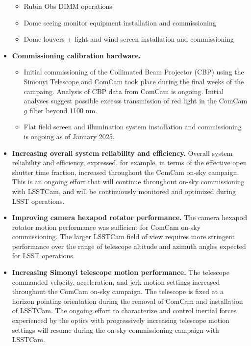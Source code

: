 \begin{itemize}
\begin{itemize}
        \item Rubin Obs DIMM operations
        \item Dome seeing monitor equipment installation and commissioning
        \item Dome louvers + light and wind screen installation and commissioning
    \end{itemize}
    \item \textbf{Commissioning calibration hardware.}
    \begin{itemize}
        \item Initial commissioning of the Collimated Beam Projector (CBP) using the Simonyi Telescope and ComCam took place during the final weeks of the campaing. Analysis of CBP data from ComCam is ongoing. Initial analyses suggest possible excesss transmission of red light in the ComCam $g$ filter beyond 1100 nm.
        \item Flat field screen and illumination system installation and commissioning is ongoing as of January 2025.
    \end{itemize}
    \item \textbf{Increasing overall system reliability and efficiency.} Overall system reliability and efficiency, expressed, for example, in terms of the effective open shutter time fraction, increased throughout the ComCam on-sky campaign. This is an ongoing effort that will continue throughout on-sky commissioning with LSSTCam, and will be continuously monitored and optimized during LSST operations.
    \item \textbf{Improving camera hexapod rotator performance.} The camera hexapod rotator motion performance was sufficient for ComCam on-sky commissioning. The larger LSSTCam field of view requires more stringent performance over the range of telescope altitude and azimuth angles expected for LSST operations.
    \item \textbf{Increasing Simonyi telescope motion performance.} The telescope commanded velocity, acceleration, and jerk motion settings increased throughout the ComCam on-sky campaign. The telescope is fixed at a horizon pointing orientation during the removal of ComCam and installation of LSSTCam. The ongoing effort to characterize and control inertial forces experienced by the optics with progressively increasing telescope motion settings will resume during the on-sky commissioning campaign with LSSTCam.
\end{itemize}